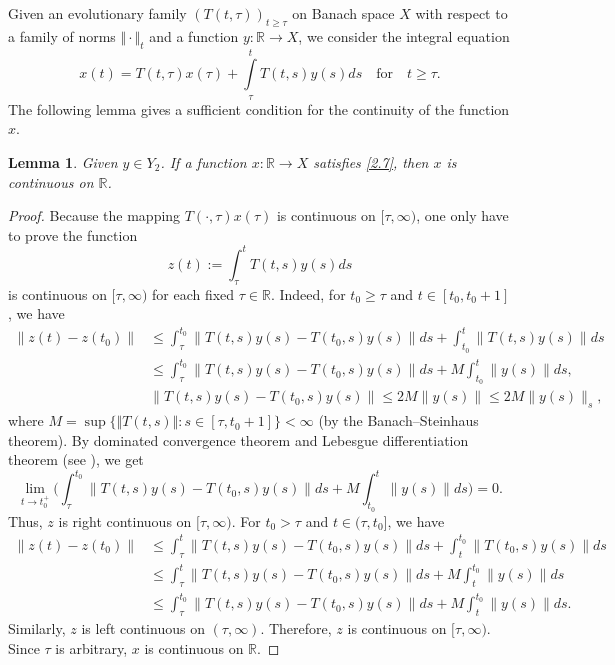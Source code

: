 \documentclass[reqno]{amsart}
\newtheorem{lemma}{Lemma}[section]
\def\r{\mathbb{R}}
\begin{document}
Given an evolutionary family $(T(t,\tau))_{t \geq \tau}$ on Banach space $X$ with respect to a family of norms $\Vert \cdot\Vert _t$ and a function $y: \r \to X$, 
we consider the integral equation
\begin{equation}
x(t)=T(t,\tau)x(\tau)+\displaystyle\int\limits_{\tau}^{t}T(t,s)y(s)ds  \quad  \text{for} \quad t\geq \tau. \label{2.7}
\end{equation}
The following lemma gives a sufficient condition for the continuity of the function $x$.
\begin{lemma}\label{lem1}
Given $y\in Y_2$. If a function $x: \r \to X$ satisfies \eqref{2.7}, then $x$ is continuous on $\r$.
\end{lemma}
\begin{proof}
Because the mapping $T(\cdot,\tau)x(\tau)$ is continuous on $[\tau,\infty)$,
one only have to prove the function
$$ z(t):= \int_\tau^t T(t,s) y(s)ds$$
is continuous on $[\tau,\infty)$ for each fixed $\tau\in \r$. Indeed, for $t_0\ge \tau$ and $t\in[t_0, t_0+1]$, we have
\begin{align*}
\|z(t)-z(t_0)\|&\le \int_{\tau}^{t_0}\| T(t,s)y(s)-T(t_0,s)y(s) \| ds 
+ \int_{t_0}^{t} \|T(t,s)y(s)\| ds\\ 
&\le   \int_{\tau}^{t_0}\| T(t,s)y(s)-T(t_0,s)y(s) \| ds 
+ M \int_{t_0}^{t} \|y(s)\|ds,\\
&\| T(t,s)y(s)-T(t_0,s)y(s) \| \le  2M \|y(s)\| \le 2M \|y(s)\|_s,
\end{align*}
where $M=\sup \{\Vert T(t,s)\Vert : s \in [\tau,t_0+1]\}< \infty$ (by the Banach--Steinhaus theorem).
By dominated convergence theorem and Lebesgue differentiation theorem (see \cite[Theorem 1.1.8 and Proposition 1.2.2, Chapt. 1]{ABHN}), we get
\[ 
\lim_{t\to t_0^+} \Big( \int_{\tau}^{t_0}\| T(t,s)y(s)-T(t_0,s)y(s) \| ds + M \int_{t_0}^{t} \|y(s)\|ds\Big) =0.
\]
Thus, $z$ is right continuous on $[\tau,\infty)$. For $t_0 > \tau$ and $t\in (\tau, t_0]$, we have
\begin{align*}
\|z(t)-z(t_0)\|&\le \int_{\tau}^{t}\| T(t,s)y(s)-T(t_0,s)y(s) \| ds + \int_{t}^{t_0} \|T(t_0,s)y(s)\| ds\\ 
&\le   \int_{\tau}^{t}\| T(t,s)y(s)-T(t_0,s)y(s) \| ds+M\int_{t}^{t_0} \|y(s)\|ds\\
&\le \int_{\tau}^{t_0}\| T(t,s)y(s)-T(t_0,s)y(s) \| ds+M\int_{t}^{t_0} \|y(s)\|ds.
\end{align*}
Similarly, $z$ is left continuous on $(\tau,\infty)$. 
Therefore, $z$ is continuous on $[\tau,\infty)$. Since $\tau$ is arbitrary, $x$ is continuous on $\r$. 
\end{proof}
\end{document}
